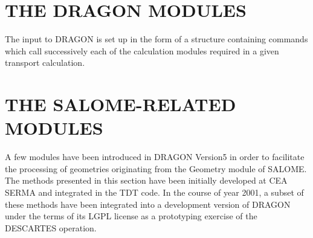 \section{THE DRAGON MODULES}\label{sect:DragonModuleInput}

The input to DRAGON is set up in the form of a structure containing commands
which call successively each of the calculation modules required in a given
transport calculation.


\section{THE SALOME-RELATED MODULES}\label{sect:SalomeModuleInput}

A few modules have been introduced in DRAGON Version5 in order to facilitate the
processing of geometries originating from the Geometry module of SALOME.\cite{salome}
The methods presented in this section have been initially developed at CEA SERMA and
integrated in the TDT code.\cite{tdt,lyioussi} In the course of year 2001, a subset of
these methods have been integrated into a development version of DRAGON under the terms
of its LGPL license as a prototyping exercise of the DESCARTES operation.\cite{salt}

